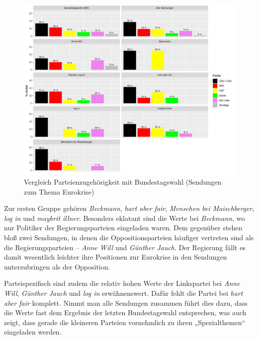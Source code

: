 \begin{figure}[ht]
	\centering
	\includegraphics[width=1\textwidth]{daten/grafiken/plot_parteizugehoerigkeit_euro.png}
	\caption{Vergleich Parteienzugehörigkeit mit Bundestagswahl (Sendungen zum Thema Eurokrise)}
	\label{plot:parteizugehoerigkeit_euro}
\end{figure}

Zur ersten Gruppe gehören \textit{Beckmann}, \textit{hart aber fair}, \textit{Menschen bei Maischberger}, \textit{log in} und \textit{maybrit illner}. Besonders eklatant sind die Werte bei \textit{Beckmann}, wo nur Politiker der Regierungsparteien eingeladen waren. Dem gegenüber stehen bloß zwei Sendungen, in denen die Oppositionsparteien häufiger vertreten sind als die Regierungsparteien – \textit{Anne Will} und \textit{Günther Jauch}. Der Regierung fällt es damit wesentlich leichter ihre Positionen zur Eurokrise in den Sendungen unterzubringen als der Opposition.

Parteispezifisch sind zudem die relativ hohen Werte der Linkspartei bei \textit{Anne Will}, \textit{Günther Jauch} und \textit{log in} erwähnenswert. Dafür fehlt die Partei bei \textit{hart aber fair} komplett. Nimmt man alle Sendungen zusammen führt dies dazu, dass die Werte fast dem Ergebnis der letzten Bundestagswahl entsprechen, was auch zeigt, dass gerade die kleineren Parteien vornehmlich zu ihren „Spezialthemen“ eingeladen werden.


